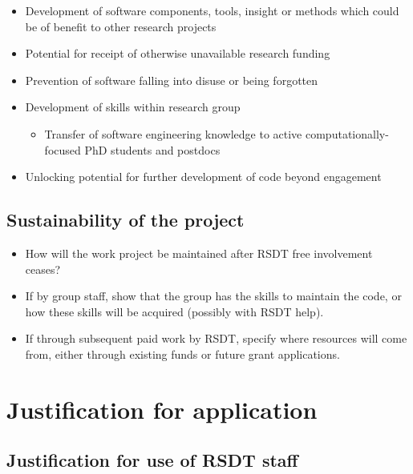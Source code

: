 \documentclass[]{scrartcl}
\begin{document}
\begin{itemize}
\itemsep1pt\parskip0pt
\item
  Development of software components, tools, insight or methods which
  could be of benefit to other research projects
\item
  Potential for receipt of otherwise unavailable research funding
\item
  Prevention of software falling into disuse or being forgotten
\item
  Development of skills within research group

  \begin{itemize}
  \itemsep1pt\parskip0pt
  \item
    Transfer of software engineering knowledge to active
    computationally-focused PhD students and postdocs
  \end{itemize}
\item
  Unlocking potential for further development of code beyond engagement
\end{itemize}

\subsection{Sustainability of the
project}\label{sustainability-of-the-project}

\begin{itemize}
\itemsep1pt\parskip0pt
\item
  How will the work project be maintained after RSDT free involvement
  ceases?
\item
  If by group staff, show that the group has the skills to maintain the
  code, or how these skills will be acquired (possibly with RSDT help).
\item
  If through subsequent paid work by RSDT, specify where resources will
  come from, either through existing funds or future grant applications.
\end{itemize}

\section{Justification for
application}\label{justification-for-application}

\subsection{Justification for use of RSDT
staff}\label{justification-for-use-of-rsdt-staff}
\end{document}
